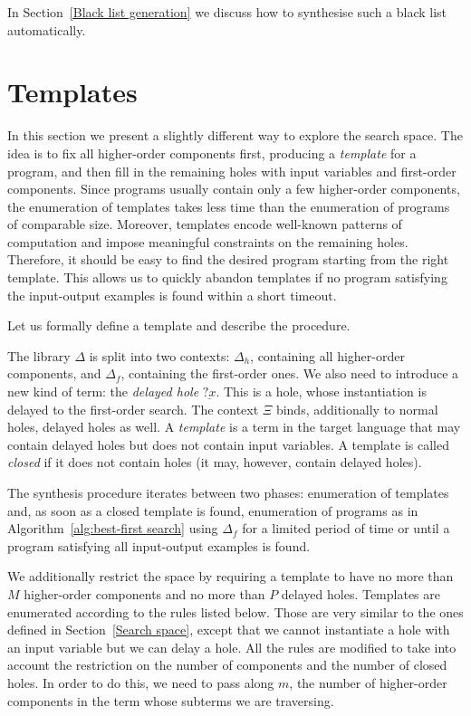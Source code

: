 In Section~\ref{Black list generation} we discuss how to synthesise such a black list automatically.

\section{Templates}\label{Templates}
In this section we present a slightly different way to explore the search space. The idea is to fix all higher-order components first, producing a \emph{template} for a program, and then fill in the remaining holes with input variables and first-order components. Since programs usually contain only a few higher-order components, the enumeration of templates takes less time than the enumeration of programs of comparable size. Moreover, templates encode well-known patterns of computation and impose meaningful constraints on the remaining holes. Therefore, it should be easy to find the desired program starting from the right template. This allows us to quickly abandon templates if no program satisfying the input-output examples is found within a short timeout.

Let us formally define a template and describe the procedure.

The library $\Delta$ is split into two contexts: $\Delta_h$, containing all higher-order components, and $\Delta_f$, containing the first-order ones. We also need to introduce a new kind of term: the \emph{delayed hole} $\underline{?x}$. This is a hole, whose instantiation is delayed to the first-order search. The context $\Xi$ binds, additionally to normal holes, delayed holes as well.
A \emph{template} is a term in the target language that may contain delayed holes but does not contain input variables. A template is called \emph{closed} if it does not contain holes (it may, however, contain delayed holes).

The synthesis procedure iterates between two phases: enumeration of templates and, as soon as a closed template is found, enumeration of programs as in Algorithm~\ref{alg:best-first search} using $\Delta_f$ for a limited period of time or until a program satisfying all input-output examples is found.

We additionally restrict the space by requiring a template to have no more than $M$ higher-order components and no more than $P$ delayed holes. Templates are enumerated according to the rules listed below. Those are very similar to the ones defined in Section~\ref{Search space}, except that we cannot instantiate a hole with an input variable but we can delay a hole. All the rules are modified to take into account the restriction on the number of components and the number of closed holes. In order to do this, we need to pass along $m$, the number of higher-order components in the term whose subterms we are traversing.

